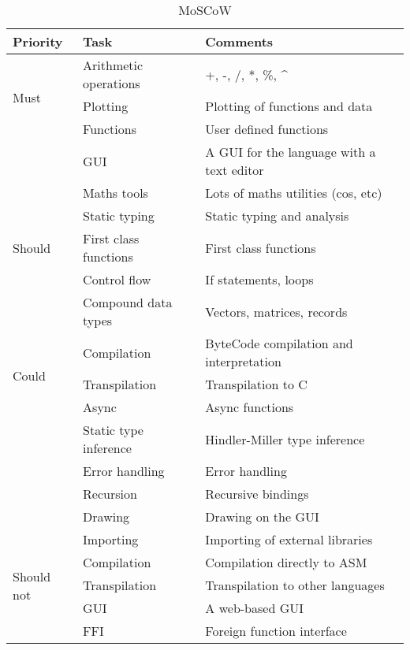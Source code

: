 \documentclass[a4paper, oneside, 11pt]{report}
\begin{document}
\begin{table}[h]
    \caption{MoSCoW}
    \begin{center}
        \begin{tabular}{|p{1in}|p{2in}|p{2.5in}|} \hline
        Priority & Task & Comments \\ \hline \hline
        \multirow{3}{1in}{Must}
        & Arithmetic operations & +, -, /, *, \%, ^ \\ \cline{2-3}
        & Plotting & Plotting of functions and data \\ \cline{2-3}
        & Functions & User defined functions \\ \cline{2-3}
        & GUI & A GUI for the language with a text editor \\ \cline{2-3}
        & Maths tools & Lots of maths utilities (cos, etc) \\ \cline{2-3}
        \multirow{3}{1in}{Should}
        & Static typing & Static typing and analysis \\ \cline{2-3}
        & First class functions & First class functions \\ \cline{2-3}
        & Control flow & If statements, loops \\ \cline{2-3}
        & Compound data types & Vectors, matrices, records \\ \cline{2-3}
        \multirow{3}{1in}{Could}
        & Compilation & ByteCode compilation and interpretation \\ \cline{2-3}
        & Transpilation & Transpilation to C \\ \cline{2-3}
        & Async & Async functions \\ \cline{2-3}
        & Static type inference & Hindler-Miller type inference \\ \cline{2-3}
        & Error handling & Error handling \\ \cline{2-3}
        & Recursion & Recursive bindings \\ \cline{2-3}
        & Drawing & Drawing on the GUI \\ \cline{2-3}
        & Importing & Importing of external libraries \\ \cline{2-3}
        \multirow{3}{1in}{Should not}
        & Compilation & Compilation directly to ASM \\ \cline{2-3}
        & Transpilation & Transpilation to other languages \\ \cline{2-3}
        & GUI & A web-based GUI \\ \cline{2-3}
        & FFI & Foreign function interface \\ \cline{2-3}
        \hline
        \end{tabular}
        \label{Table1}
    \end{center}
\end{table}
\end{document}
